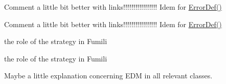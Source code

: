 
\begin{DoxyRefList}
\item[Global \mbox{\hyperlink{classROOT_1_1Minuit2_1_1FCNBase_a04ef08ddad92ce8d89d498efbe021c39}{R\+O\+OT\+:\+:Up}} () const =0]\label{todo__todo000001}%
%
Comment a little bit better with links!!!!!!!!!!!!!!!!! Idem for \mbox{\hyperlink{classROOT_1_1Minuit2_1_1FCNBase_ac4592475c58a65b037ba97ab5f3cba10}{Error\+Def()}}

\label{todo__todo000013}%
%
Comment a little bit better with links!!!!!!!!!!!!!!!!! Idem for \mbox{\hyperlink{classROOT_1_1Minuit2_1_1FCNBase_ac4592475c58a65b037ba97ab5f3cba10}{Error\+Def()}} 
\item[Class \mbox{\hyperlink{classROOT_1_1Minuit2_1_1FumiliBuilder}{R\+O\+OT\+:\+:Fumili\+Builder}} ]\label{todo__todo000002}%
%
the role of the strategy in Fumili

\label{todo__todo000014}%
%
the role of the strategy in Fumili 
\item[Global \mbox{\hyperlink{classROOT_1_1Minuit2_1_1FumiliBuilder_a1e7bd763cd6677dd08d528079143d7b2}{R\+O\+OT\+:\+:Estimator}} () const]\label{todo__todo000005}%
%
Maybe a little explanation concerning E\+DM in all relevant classes.


\end{DoxyRefList}
